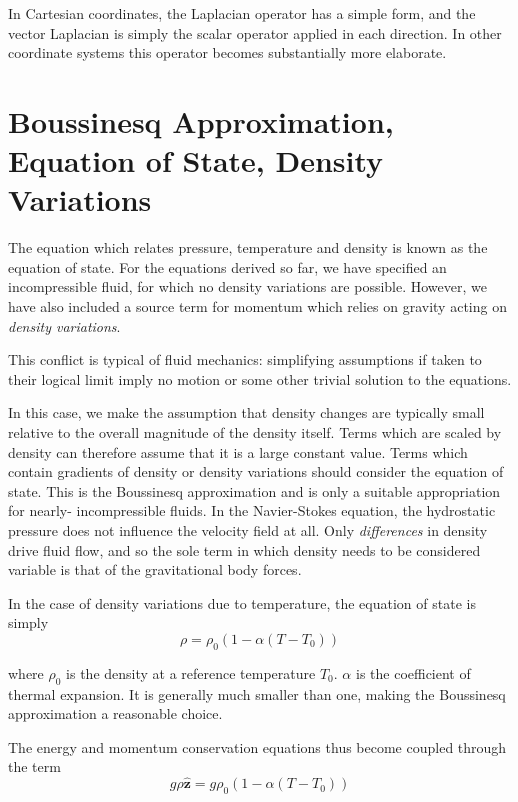 \documentclass[10pt]{article}
\begin{document}
	In Cartesian coordinates, the Laplacian operator has a simple form, and the vector Laplacian is simply
	the scalar operator applied in each direction. In other coordinate systems this operator becomes
	substantially more elaborate. 
	
	
	
\section{Boussinesq Approximation, Equation of State, Density Variations}
	
	The equation which relates pressure, temperature and 
	density is known as the equation of state. For the equations
	derived so far, we have specified an incompressible fluid, for which 
	no density variations are possible. However, we have also 
	included a source term for momentum which relies on gravity
	acting on {\em density variations}.
	
	This conflict is typical of fluid mechanics: simplifying assumptions
	if taken to their logical limit imply no motion or some other trivial
	solution to the equations. 
	
	In this case, we make the assumption that density changes are typically
	small relative to the overall magnitude of the density itself. Terms which
	are scaled by density can therefore assume that it is a large constant value. 
	Terms which contain gradients of density or density variations should consider
	the equation of state. This is the Boussinesq approximation and is only a suitable
	appropriation for nearly- incompressible fluids. In the Navier-Stokes equation,
	the hydrostatic pressure does not influence the velocity field at all. 
	Only \textit{differences} in density drive fluid flow, and so the sole term in which
	density needs to be considered variable is that of the gravitational body forces.
	
	In the case of density variations due to temperature, the equation of state
	is simply
		\begin{equation}
			\rho = \rho_0 \left(1 - \alpha ( T-T_0 )\right)
			\label{eq:state}
		\end{equation}
		
	where $\rho_0$ is the density at a reference temperature $T_0$. $\alpha$ is
	the coefficient of thermal expansion. It is generally much smaller than one, making
	the Boussinesq approximation a reasonable choice.
	
	The energy and momentum
	conservation equations thus become coupled through the term
		\begin{equation}
			g\rho\hat{\mathbf{z}} = g \rho_0 \left(1 - \alpha(T-T_0)\right)
		\end{equation}
		
\end{document}
